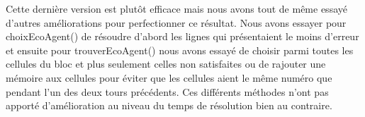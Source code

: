      Cette dernière version est plutôt efficace mais nous avons tout de même essayé d'autres améliorations pour perfectionner ce résultat. Nous avons essayer pour choixEcoAgent() de résoudre d'abord les lignes qui présentaient le moins d'erreur et ensuite pour trouverEcoAgent() nous avons essayé de choisir parmi toutes les cellules du bloc et plus seulement celles non satisfaites ou de rajouter une mémoire aux cellules pour éviter que les cellules aient le même numéro que pendant l'un des deux tours précédents. Ces différents méthodes n'ont pas apporté d'amélioration au niveau du temps de résolution bien au contraire. 